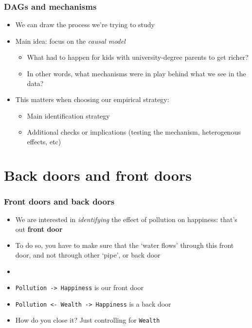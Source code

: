 \documentclass[aspectratio=43]{beamer}
\begin{document}
\begin{frame}
\frametitle{DAGs and mechanisms}
\centering

\begin{itemize}[<+->]
\item We can draw the process we're trying to study
\item Main idea: focus on the \textit{causal model}
  \begin{itemize}
  \item What had to happen for kids with university-degree parents to get richer?
  \item In other words, what mechanisms were in play behind what we see in the data?
  \end{itemize}
\item This matters when choosing our empirical strategy:
  \begin{itemize}
  \item Main identification strategy
  \item Additional checks or implications (testing the mechanism, heterogenous effects, etc)
  \end{itemize}
\end{itemize}

\end{frame}

\section{Back doors and front doors}

\begin{frame}
\frametitle{Front doors and back doors}
\centering

\begin{itemize}
  \item<1-> We are interested in \textit{identifying} the effect of pollution on happiness: that's out \textbf{front door}
  \item<2-> To do so, you have to make sure that the `water flows' through this front door, and not through other `pipe', or back door
  \item[]
  \item<3-> \texttt{Pollution -> Happiness} is our front door
  \item<3-> \texttt{Pollution <- Wealth -> Happiness} is a back door
  \item<4-> How do you close it? Just controlling for \texttt{Wealth}
\end{itemize}

\end{frame}
\end{document}
